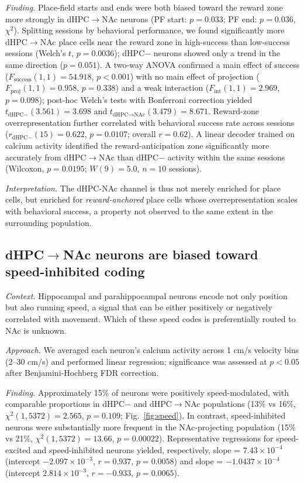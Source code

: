 \documentclass[11pt]{article}
\begin{document}
\textit{Finding.} Place-field starts and ends were both biased toward the reward zone more strongly in dHPC$\rightarrow$NAc neurons (PF start: $p=0.033$; PF end: $p=0.036$, $\chi^2$). Splitting sessions by behavioral performance, we found significantly more dHPC$\rightarrow$NAc place cells near the reward zone in high-success than low-success sessions (Welch's $t$, $p=0.0036$); dHPC$-$ neurons showed only a trend in the same direction ($p=0.051$). A two-way ANOVA confirmed a main effect of success ($F_{\text{success}}(1,1)=54.918$, $p<0.001$) with no main effect of projection ($F_{\text{proj}}(1,1)=0.958$, $p=0.338$) and a weak interaction ($F_{\text{int}}(1,1)=2.969$, $p=0.098$); post-hoc Welch's tests with Bonferroni correction yielded $t_{\text{dHPC}-}(3.561)=3.698$ and $t_{\text{dHPC}\rightarrow\text{NAc}}(3.479)=8.671$. Reward-zone overrepresentation further correlated with behavioral success rate across sessions ($r_{\text{dHPC}-}(15)=0.622$, $p=0.0107$; overall $r=0.62$). A linear decoder trained on calcium activity identified the reward-anticipation zone significantly more accurately from dHPC$\rightarrow$NAc than dHPC$-$ activity within the same sessions (Wilcoxon, $p=0.0195$; $W(9)=5.0$, $n=10$ sessions).

\textit{Interpretation.} The dHPC-NAc channel is thus not merely enriched for place cells, but enriched for \emph{reward-anchored} place cells whose overrepresentation scales with behavioral success, a property not observed to the same extent in the surrounding population.

\subsection{dHPC$\rightarrow$NAc neurons are biased toward speed-inhibited coding}

\textit{Context.} Hippocampal and parahippocampal neurons encode not only position but also running speed, a signal that can be either positively or negatively correlated with movement. Which of these speed codes is preferentially routed to NAc is unknown.

\textit{Approach.} We averaged each neuron's calcium activity across 1 cm/s velocity bins (2--30 cm/s) and performed linear regression; significance was assessed at $p<0.05$ after Benjamini-Hochberg FDR correction.

\textit{Finding.} Approximately 15\% of neurons were positively speed-modulated, with comparable proportions in dHPC$-$ and dHPC$\rightarrow$NAc populations (13\% vs 16\%, $\chi^2(1,5372)=2.565$, $p=0.109$; Fig.~\ref{fig:speed}). In contrast, speed-inhibited neurons were substantially more frequent in the NAc-projecting population (15\% vs 21\%, $\chi^2(1,5372)=13.66$, $p=0.00022$). Representative regressions for speed-excited and speed-inhibited neurons yielded, respectively, slope = $7.43\times10^{-4}$ (intercept $-2.097\times10^{-3}$, $r=0.937$, $p=0.0058$) and slope = $-1.0437\times10^{-4}$ (intercept $2.814\times10^{-3}$, $r=-0.933$, $p=0.0065$).
\end{document}
